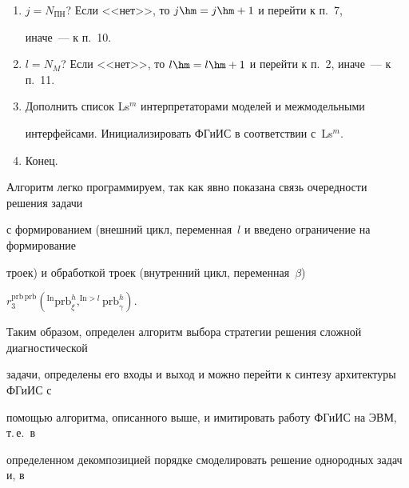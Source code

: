 \begin{enumerate}[1.]
выходов подать на входы моделей $\{\mathrm{mod}^a_\psi\}$. Используя нечеткую или экспертную


системы ({алгоритм}~1 и табл.~4.1--4.4 приложения~4 в~\cite{9-kir}), получить оценки


моделей $\{\mathrm{mod}^a_\psi\}$ задачи prb$^h_\gamma$, занося оценки в числители


дро\-бей-эле\-мен\-тов $\varepsilon^j_{q\,\psi}$ матрицы~$E^l_j$. Выбрать $\max\limits_{q\psi}


\{\varepsilon^j_{q\psi}\}$ пару моделей и занести ее в список Ls$^m$.


\item $ j = N_{\mathrm{ПН}}$? Если <<нет>>, то $j\hm = j \hm+ 1$ и перейти к п.~7,


иначе~--- к п.~10.


\item $l = N_M$? Если <<нет>>, то $l\hm = l \hm+ 1$ и перейти к п.~2, иначе~--- к п.~11.


\item Дополнить список Ls$^m$ интерпретаторами моделей и межмодельными


интерфейсами. Инициализировать ФГиИС в соответствии с~Ls$^m$.


\item Конец.


\end{enumerate}





 Алгоритм легко программируем, так как явно показана связь очеред\-ности решения задачи


с формированием (внешний цикл, переменная~$l$ и введено ограничение на формирование


троек) и обработкой троек (внутренний цикл, переменная~$\beta$)


 $r_3^{\mathrm{prb\,prb}}\left(^{\mathrm{In}}\mathrm{prb}^h_\xi,^{\mathrm{In}>l}\mathrm{prb}^h_\gamma\right)


$.





 Таким образом, определен алгоритм выбора стратегии решения сложной диагностической


задачи, определены его входы и выход и можно перейти к синтезу архитектуры ФГиИС с


помощью алгоритма, описанного выше, и имитировать работу ФГиИС на ЭВМ, т.\,е.\ в


определенном декомпозицией порядке смоделировать решение однородных задач и, в


